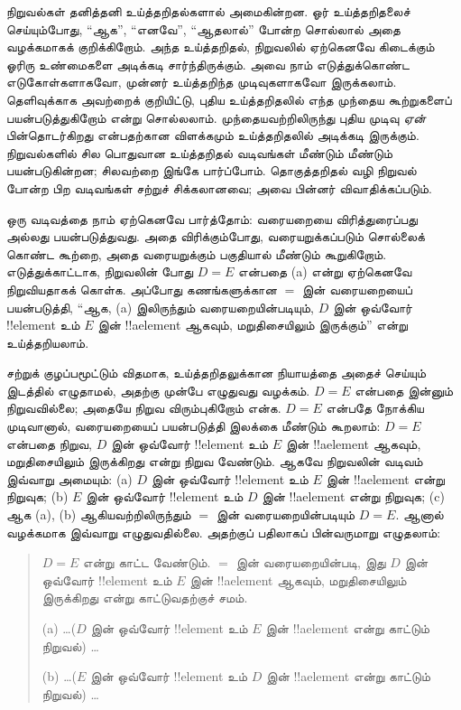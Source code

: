 \documentclass[../../../include/open-logic-section]{subfiles}
\begin{document}


நிறுவல்கள் தனித்தனி உய்த்தறிதல்களால் அமைகின்றன. ஓர்
உய்த்தறிதலைச் செய்யும்போது, ``ஆக'', ``எனவே'', ``ஆதலால்''
போன்ற சொல்லால் அதை வழக்கமாகக் குறிக்கிறோம். அந்த உய்த்தறிதல்,
நிறுவலில் ஏற்கெனவே கிடைக்கும் ஓரிரு உண்மைகளை அடிக்கடி
சார்ந்திருக்கும். அவை நாம் எடுத்துக்கொண்ட எடுகோள்களாகவோ,
முன்னர் உய்த்தறிந்த முடிவுகளாகவோ இருக்கலாம். தெளிவுக்காக
அவற்றைக் குறியிட்டு, புதிய உய்த்தறிதலில் எந்த முந்தைய
கூற்றுகளைப் பயன்படுத்துகிறோம் என்று சொல்லலாம். முந்தையவற்றிலிருந்து
புதிய முடிவு \emph{ஏன்} பின்தொடர்கிறது என்பதற்கான விளக்கமும்
உய்த்தறிதலில் அடிக்கடி இருக்கும். நிறுவல்களில் சில பொதுவான
உய்த்தறிதல் வடிவங்கள் மீண்டும் மீண்டும் பயன்படுகின்றன; சிலவற்றை
இங்கே பார்ப்போம். தொகுத்தறிதல் வழி நிறுவல் போன்ற பிற வடிவங்கள்
சற்றுச் சிக்கலானவை; அவை பின்னர் விவாதிக்கப்படும்.

ஒரு வடிவத்தை நாம் ஏற்கெனவே பார்த்தோம்: வரையறையை
விரித்துரைப்பது அல்லது பயன்படுத்துவது. அதை விரிக்கும்போது,
வரையறுக்கப்படும் சொல்லைக் கொண்ட கூற்றை, அதை வரையறுக்கும்
பகுதியால் மீண்டும் கூறுகிறோம். எடுத்துக்காட்டாக, நிறுவலின்
போது $D = E$ என்பதை (a) என்று ஏற்கெனவே நிறுவியதாகக்
கொள்க. அப்போது கணங்களுக்கான $=$ இன் வரையறையைப்
பயன்படுத்தி, ``ஆக, (a) இலிருந்தும் வரையறையின்படியும்,
$D$ இன் ஒவ்வோர் !!{element} உம் $E$ இன்
!!a{element} ஆகவும், மறுதிசையிலும் இருக்கும்'' என்று
உய்த்தறியலாம்.

சற்றுக் குழப்பமூட்டும் விதமாக, உய்த்தறிதலுக்கான நியாயத்தை
அதைச் செய்யும் இடத்தில் எழுதாமல், அதற்கு முன்பே எழுதுவது
வழக்கம். $D = E$ என்பதை இன்னும் நிறுவவில்லை; அதையே
நிறுவ விரும்புகிறோம் என்க. $D = E$ என்பதே நோக்கிய முடிவானால்,
வரையறையைப் பயன்படுத்தி இலக்கை மீண்டும் கூறலாம்:
$D = E$ என்பதை நிறுவ, $D$ இன் ஒவ்வோர் !!{element}
உம் $E$ இன் !!a{element} ஆகவும், மறுதிசையிலும்
இருக்கிறது என்று நிறுவ வேண்டும். ஆகவே நிறுவலின் வடிவம்
இவ்வாறு அமையும்: (a) $D$ இன் ஒவ்வோர் !!{element}
உம் $E$ இன் !!a{element} என்று நிறுவுக; (b) $E$ இன்
ஒவ்வோர் !!{element} உம் $D$ இன் !!a{element}
என்று நிறுவுக; (c) ஆக (a), (b) ஆகியவற்றிலிருந்தும்
$=$ இன் வரையறையின்படியும் $D = E$. ஆனால் வழக்கமாக
இவ்வாறு எழுதுவதில்லை. அதற்குப் பதிலாகப் பின்வருமாறு
எழுதலாம்:
\begin{quote}
$D = E$ என்று காட்ட வேண்டும். $=$ இன் வரையறையின்படி,
இது $D$ இன் ஒவ்வோர் !!{element} உம் $E$ இன்
!!a{element} ஆகவும், மறுதிசையிலும் இருக்கிறது என்று
காட்டுவதற்குச் சமம்.

(a) \dots ($D$ இன் ஒவ்வோர் !!{element} உம் $E$ இன்
!!a{element} என்று காட்டும் நிறுவல்) \dots

(b) \dots ($E$ இன் ஒவ்வோர் !!{element} உம் $D$ இன்
!!a{element} என்று காட்டும் நிறுவல்) \dots
\end{quote}
\end{document}
